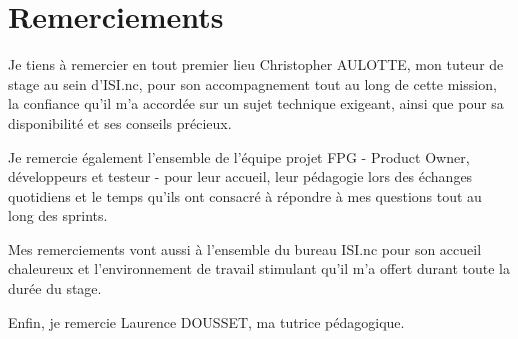 
\chapter*{Remerciements}

Je tiens à remercier en tout premier lieu Christopher AULOTTE, mon
tuteur de stage au sein d'ISI.nc, pour son accompagnement tout au long de
cette mission, la confiance qu'il m'a accordée sur un sujet technique
exigeant, ainsi que pour sa disponibilité et ses conseils précieux.

Je remercie également l'ensemble de l'équipe projet FPG  -  Product Owner,
développeurs et testeur  -  pour leur accueil, leur pédagogie lors des
échanges quotidiens et le temps qu'ils ont consacré à répondre à mes
questions tout au long des sprints.

Mes remerciements vont aussi à l'ensemble du bureau ISI.nc pour son
accueil chaleureux et l'environnement de travail stimulant qu'il m'a
offert durant toute la durée du stage.

Enfin, je remercie Laurence DOUSSET, ma tutrice pédagogique.
\newpage
